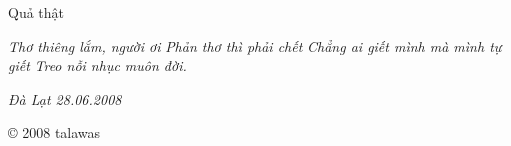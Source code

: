 \documentclass[../main.tex]{subfiles}
\begin{document}
\begin{multicols}{2}
\begin{blockquote}
\end{blockquote}
 
Quả thật 
\begin{blockquote}
        
\textit{Thơ thiêng lắm, người ơi}        
\textit{Phản thơ thì phải chết}        
\textit{Chẳng ai giết mình mà mình tự giết} 
\textit{Treo nỗi nhục muôn đời.} 

\end{blockquote}
 
 
\textit{Đà Lạt 28.06.2008} 
 
© 2008 talawas 




\end{multicols}
\end{document}

